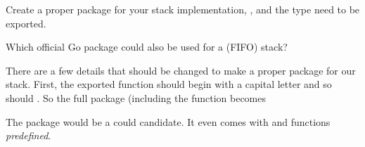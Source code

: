 \begin{Exercise}[title={Stack as package},difficulty=2]
\label{ex:stack-package}
\Question\label{ex:stack-package q1} Create a proper package for your
stack implementation, ,  and the  type need to be
exported.

\Question\label{ex:stack-package q2} Which official Go package could
also be used for a (FIFO) stack?

\end{Exercise}

\begin{Answer}
\Question There are a few details that should be changed to make a proper package
for our stack. First, the exported function should begin with a capital 
letter and so should . So the full package (including the
 function becomes


\Question The  package would be a could candidate. It
even comes with  and  functions \emph{predefined}.
\end{Answer}
